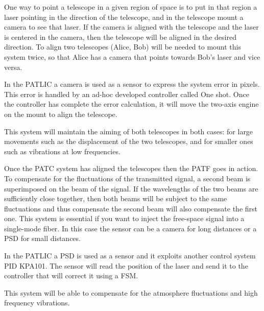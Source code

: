 One way to point a telescope in a given region of space is to put in that region a laser pointing in the direction of the telescope, and in the telescope mount a camera to see that laser.
If the camera is aligned with the telescope and the laser is centered in the camera, then the telescope will be aligned in the desired direction.
To align two telescopes (Alice, Bob) will be needed to mount this system twice, so that Alice has a camera that points towards Bob’s laser and vice versa.

In the PATLIC a camera is used as a sensor to express the system error in pixels. This error is handled by an ad-hoc developed controller called One shot. Once the controller has complete the error calculation, it will move the two-axis engine on the mount to align the telescope.

This system will maintain the aiming of both telescopes in both cases: for large movements such as the displacement of the two telescopes, and for smaller ones such as vibrations at low frequencies.


Once the PATC system has aligned the telescopes then the PATF goes in action. To compensate for the fluctuations of the transmitted signal, a second beam is superimposed on the beam of the signal. If the wavelengths of the two beams are sufficiently close together, then both beams will be subject to the same fluctuations and thus compensate the second beam will also compensate the first one.
This system is essential if you want to inject the free-space signal into a single-mode fiber. In this case the sensor can be a camera for long distances or a PSD for small distances.

In the PATLIC a PSD is used as a sensor and it exploits another control system PID KPA101. The sensor will read the position of the laser and send it to the controller that will correct it using a FSM.

This system will be able to compensate for the atmosphere fluctuations and high frequency vibrations.